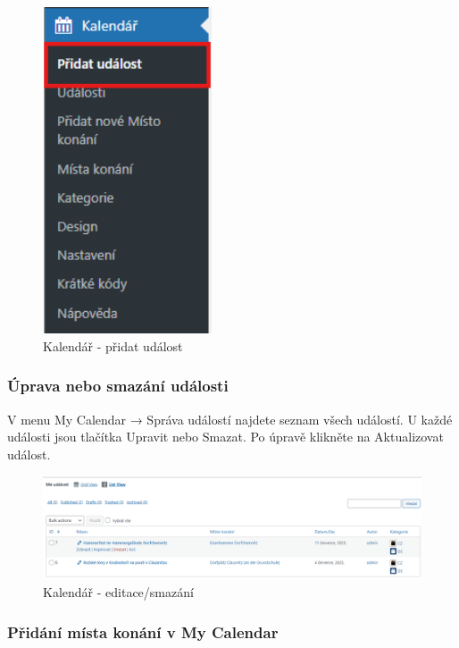 \documentclass[12pt,a4paper]{article}
\begin{document}
	\begin{figure}[htp]
		\centering
		\includegraphics[width=5cm]{WPcalendarEventCreate.png}
		\caption{Kalendář - přidat událost}
		\label{fig:role}
	\end{figure}
	
	\subsubsection{Úprava nebo smazání události}
	
	V menu My Calendar → Správa událostí najdete seznam všech událostí. U každé události jsou tlačítka Upravit nebo Smazat. Po úpravě klikněte na Aktualizovat událost.
	
	\begin{figure}[htp]
		\centering
		\includegraphics[width=15cm]{WPcalendarEventDelete.png}
		\caption{Kalendář - editace/smazání}
		\label{fig:role}
	\end{figure}

	
	\newpage
	\subsubsection{Přidání místa konání v My Calendar}
	
\end{document}
